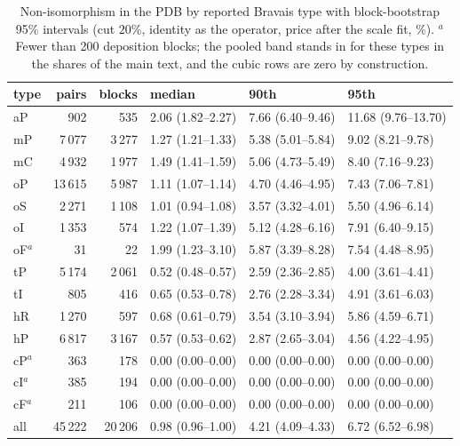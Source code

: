 \documentclass[preprint,pdf]{iucr}          %
\begin{document}
\begin{table}
\caption{Non-isomorphism in the PDB by reported Bravais type with block-bootstrap 95\% intervals (cut $20\%$, identity as the operator, price after the scale fit, \%). $^a$Fewer than 200 deposition blocks; the pooled band stands in for these types in the shares of the main text, and the cubic rows are zero by construction.}
\label{tab:bootstrap}
\begin{footnotesize}
\begin{tabular}{lrrlll}
\toprule
type & pairs & blocks & median & 90th & 95th \\
\midrule
aP & 902 & 535 & 2.06 (1.82--2.27) & 7.66 (6.40--9.46) & 11.68 (9.76--13.70) \\
mP & 7\,077 & 3\,277 & 1.27 (1.21--1.33) & 5.38 (5.01--5.84) & 9.02 (8.21--9.78) \\
mC & 4\,932 & 1\,977 & 1.49 (1.41--1.59) & 5.06 (4.73--5.49) & 8.40 (7.16--9.23) \\
oP & 13\,615 & 5\,987 & 1.11 (1.07--1.14) & 4.70 (4.46--4.95) & 7.43 (7.06--7.81) \\
oS & 2\,271 & 1\,108 & 1.01 (0.94--1.08) & 3.57 (3.32--4.01) & 5.50 (4.96--6.14) \\
oI & 1\,353 & 574 & 1.22 (1.07--1.39) & 5.12 (4.28--6.16) & 7.91 (6.40--9.15) \\
oF$^a$ & 31 & 22 & 1.99 (1.23--3.10) & 5.87 (3.39--8.28) & 7.54 (4.48--8.95) \\
tP & 5\,174 & 2\,061 & 0.52 (0.48--0.57) & 2.59 (2.36--2.85) & 4.00 (3.61--4.41) \\
tI & 805 & 416 & 0.65 (0.53--0.78) & 2.76 (2.28--3.34) & 4.91 (3.61--6.03) \\
hR & 1\,270 & 597 & 0.68 (0.61--0.79) & 3.54 (3.10--3.94) & 5.86 (4.59--6.71) \\
hP & 6\,817 & 3\,167 & 0.57 (0.53--0.62) & 2.87 (2.65--3.04) & 4.56 (4.22--4.95) \\
cP$^a$ & 363 & 178 & 0.00 (0.00--0.00) & 0.00 (0.00--0.00) & 0.00 (0.00--0.00) \\
cI$^a$ & 385 & 194 & 0.00 (0.00--0.00) & 0.00 (0.00--0.00) & 0.00 (0.00--0.00) \\
cF$^a$ & 211 & 106 & 0.00 (0.00--0.00) & 0.00 (0.00--0.00) & 0.00 (0.00--0.00) \\
all & 45\,222 & 20\,206 & 0.98 (0.96--1.00) & 4.21 (4.09--4.33) & 6.72 (6.52--6.98) \\
\bottomrule
\end{tabular}
\end{footnotesize}
\end{table}
\end{document}
